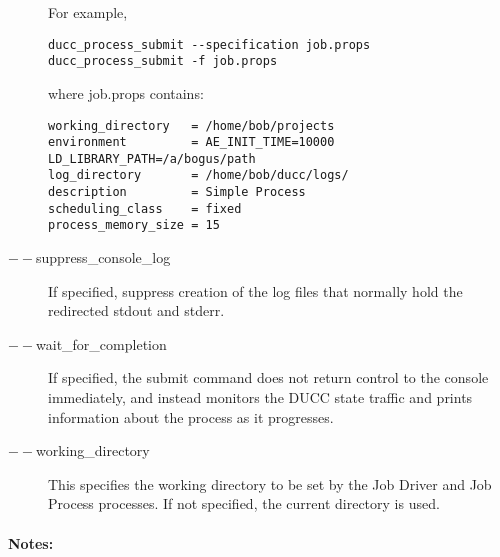 \begin{description}
          For example, 
\begin{verbatim}
ducc_process_submit --specification job.props 
ducc_process_submit -f job.props 
\end{verbatim}

          where job.props contains: 
\begin{verbatim}
working_directory   = /home/bob/projects
environment         = AE_INIT_TIME=10000 LD_LIBRARY_PATH=/a/bogus/path 
log_directory       = /home/bob/ducc/logs/ 
description         = Simple Process
scheduling_class    = fixed 
process_memory_size = 15 
\end{verbatim}

        \item[$--$suppress\_console\_log] If specified, suppress creation of the log files that 
          normally hold the redirected stdout and stderr.

        \item[$--$wait\_for\_completion ] If specified, the submit command does not return control to
          the console immediately, and instead monitors the DUCC state traffic and prints
          information about the process as it progresses.
          
        \item[$--$working\_directory ] This specifies the working directory to be set by the Job
          Driver and Job Process processes.  If not specified, the current directory is used.

     \end{description}
        
    \paragraph{Notes:}

